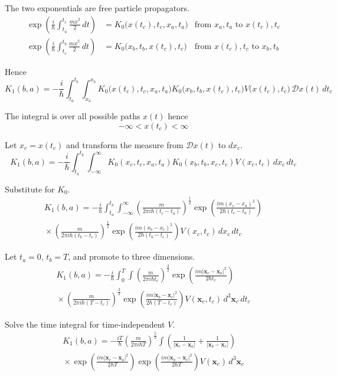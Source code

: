 The two exponentials are free particle propagators.
\begin{align*}
\exp\left(\frac{i}{\hbar}\int_{t_a}^{t_c}\frac{m\dot x^2}{2}\,dt\right)
&=K_0\bigl(x(t_c),t_c,x_a,t_a\bigr)
&\text{from $x_a,t_a$ to $x(t_c),t_c$}
\\
\exp\left(\frac{i}{\hbar}\int_{t_c}^{t_b}\frac{m\dot x^2}{2}\,dt\right)
&=K_0\bigl(x_b,t_b,x(t_c),t_c\bigr)
&\text{from $x(t_c),t_c$ to $x_b,t_b$}
\end{align*}

Hence
\begin{equation*}
K_1(b,a)=-\frac{i}{\hbar}\int_{t_a}^{t_b}\int_{x_a}^{x_b}
K_0\bigl(x(t_c),t_c,x_a,t_a\bigr)K_0\bigl(x_b,t_b,x(t_c),t_c\bigr)
V\bigl(x(t_c),t_c\bigr)
\,\mathscr Dx(t)\,dt_c
\end{equation*}

The integral is over all possible paths $x(t)$ hence
\begin{equation*}
-\infty<x(t_c)<\infty
\end{equation*}

Let $x_c=x(t_c)$ and transform the measure from $\mathscr Dx(t)$ to $dx_c$.
\begin{equation*}
K_1(b,a)=-\frac{i}{\hbar}\int_{t_a}^{t_b}\int_{-\infty}^\infty
K_0(x_c,t_c,x_a,t_a)K_0(x_b,t_b,x_c,t_c)
V(x_c,t_c)
\,dx_c\,dt_c
\end{equation*}

Substitute for $K_0$.
\begin{multline*}
K_1(b,a)=-\frac{i}{\hbar}\int_{t_a}^{t_b}\int_{-\infty}^\infty
\left(\frac{m}{2\pi i\hbar(t_c-t_a)}\right)^\frac{1}{2}
\exp\left(\frac{im(x_c-x_a)^2}{2\hbar(t_c-t_a)}\right)
\\
{}\times
\left(\frac{m}{2\pi i\hbar(t_b-t_c)}\right)^\frac{1}{2}
\exp\left(\frac{im(x_b-x_c)^2}{2\hbar(t_b-t_c)}\right)
V(x_c,t_c)
\,dx_c\,dt_c
\end{multline*}

Let $t_a=0$, $t_b=T$, and promote to three dimensions.
\begin{multline*}
K_1(b,a)=-\frac{i}{\hbar}\int_0^T\int
\left(\frac{m}{2\pi i\hbar t_c}\right)^\frac{3}{2}
\exp\left(\frac{im|\mathbf x_c-\mathbf x_a|^2}{2\hbar t_c}\right)
\\
{}\times
\left(\frac{m}{2\pi i\hbar(T-t_c)}\right)^\frac{3}{2}
\exp\left(\frac{im|\mathbf x_b-\mathbf x_c|^2}{2\hbar(T-t_c)}\right)
V(\mathbf x_c,t_c)
\,d^3\mathbf x_c\,dt_c
\end{multline*}



Solve the time integral for time-independent $V$.
\begin{multline*}
K_1(b,a)=-\frac{iT}{\hbar}\left(\frac{m}{2\pi i\hbar T}\right)^\frac{5}{2}
\int
\left(\frac{1}{|\mathbf x_c-\mathbf x_a|}
+\frac{1}{|\mathbf x_b-\mathbf x_c|}\right)
\\
{}\times
\exp\left(\frac{im|\mathbf x_c-\mathbf x_a|^2}{2\hbar T}\right)
\exp\left(\frac{im|\mathbf x_b-\mathbf x_c|^2}{2\hbar T}\right)
V(\mathbf x_c)
\,d^3\mathbf x_c
\end{multline*}


